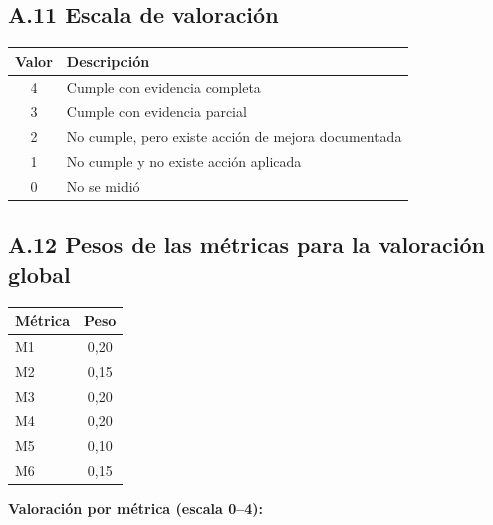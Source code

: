 \subsection*{A.11 Escala de valoración}

\begin{tabular}{cl}
\hline
\textbf{Valor} & \textbf{Descripción} \\
\hline

4 & Cumple con evidencia completa \\

3 & Cumple con evidencia parcial \\

2 & No cumple, pero existe acción de mejora documentada \\

1 & No cumple y no existe acción aplicada \\

0 & No se midió \\

\hline
\end{tabular}

\subsection*{A.12 Pesos de las métricas para la valoración global}

\begin{tabular}{lc}
\hline
\textbf{Métrica} & \textbf{Peso} \\
\hline

M1 & 0,20 \\
M2 & 0,15 \\
M3 & 0,20 \\
M4 & 0,20 \\
M5 & 0,10 \\
M6 & 0,15 \\

\hline
\end{tabular}

\vspace{0.2cm}

\noindent\textbf{Valoración por métrica (escala 0--4):}

